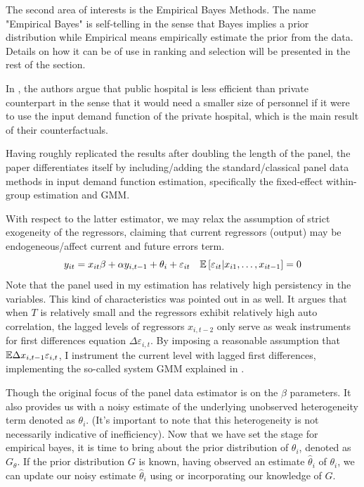 \documentclass[12pt]{article}
\begin{document}
The second area of interests is the Empirical Bayes Methods. The name
"Empirical Bayes" is self-telling in the sense that Bayes implies a prior
distribution while Empirical means empirically estimate the prior from the
data. Details on how it can be of use in ranking and selection will be
presented in the rest of the section.

In \cite{croiset2024hospitals}, the authors argue that public hospital is less
efficient than private counterpart in the sense that it would need a smaller
size of personnel if it were to use the input demand function of the private
hospital, which is the main result of their counterfactuals.

Having roughly replicated the results after doubling the length of the panel,
the paper differentiates itself by including/adding the standard/classical
panel data methods in input demand function estimation, specifically the
fixed-effect within-group estimation and GMM.

With respect to the latter estimator, we may relax the assumption of strict
exogeneity of the regressors, claiming that current regressors (output) may be
endogeneous/affect current and future errors term.
\begin{equation*}
    y_{it}  = x_{it} \beta + \alpha y_{i,t-1}+\theta_i + \varepsilon_{it} \quad  \mathbb{E}\left[\varepsilon_{it}|x_{i1},\ldots,x_{it-1}\right] =0
\end{equation*}
Note that the panel used in my estimation has relatively high persistency in the variables. This kind of characteristics was pointed out in \cite{blundell1998initial} as well. It argues that when $T$ is relatively small and the regressors exhibit relatively high auto correlation, the lagged levels of regressors $x_{i,t-2}$ only serve as weak instruments for first differences equation $\Delta \varepsilon_{i,t}$. By imposing a reasonable assumption that $\mathbb{E}{\Delta x_{i,t-1}\varepsilon_{i,t}}$, I instrument the current level with lagged first differences, implementing the so-called system GMM explained in \cite{arellano1995another,blundell1998initial}.

Though the original focus of the panel data estimator is on the $\beta$
parameters. It also provides us with a noisy estimate of the underlying
unobserved heterogeneity term denoted as $\theta_i$. (It's important to note
that this heterogeneity is not necessarily indicative of inefficiency). Now
that we have set the stage for empirical bayes, it is time to bring about the
prior distribution of $\theta_i$, denoted as $G_{\theta}$. If the prior
distribution $G$ is known, having observed an estimate $\hat{\theta}_i$ of
$\theta_i$, we can update our noisy estimate $\hat{\theta}_i$ using or
incorporating our knowledge of $G$.
\end{document}
